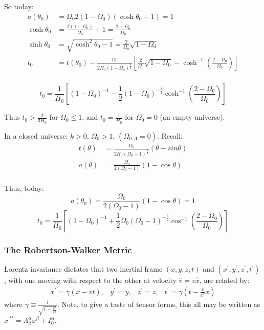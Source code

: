 \documentclass{article}
\def\hf{\frac12}
\def\inv#1{\frac{1}{ #1}}
\def\thnot{\theta_0}
\def\etot{\Omega_0}
\def\econs{\Omega_{0,\Lambda}}
\def\econs{\Omega_{0,\Lambda}}
\def\p{^\prime}
\def\hf{\frac12}
\def\thnot{\theta_0}
\def\etot{\Omega_0}
\def\econs{\Omega_{0,\Lambda}}
\def\econs{\Omega_{0,\Lambda}}
\def\p{^\prime}
\begin{document}
So today: 
\begin{align}
a(\thnot)&={\etot}{ 2(1-\etot)}(\cosh\thnot -1)=1\\
\cosh\thnot&=\frac{2(1-\etot)}{\etot}+1=\frac{2-\etot}{\etot}\\
\sinh\thnot&=\sqrt{\cosh^2\thnot-1}=\frac{2}{\etot}\sqrt{1-\etot}\\
t_0&=t(\thnot)-\frac{\etot}{ 2H_0(1-\etot)^\frac{3}{ 2}}\left[\frac{2}{\etot}
\sqrt{1-\etot}-\cosh^{-1}\left(\frac{2-\etot}{\etot}\right)\right]\\
\end{align}

$$\boxed{t_0=\inv{H_0}\left[(1-\etot)^{-1}-\hf(1-\etot)^{-\frac{3}{ 2}}
\cosh^{-1}\left(\frac{2-\etot}{\etot}\right)\right]}$$

Thus $t_0>\frac{2}{ 3H_0}$ for $\etot\le 1$, and $t_0=\inv{H_0}$ for $\etot=0$
(an empty universe).

In a closed universe: $k>0$, $\etot>1$, $(\econs=0)$. Recall: 
\begin{align}
t(\theta)&=\frac{\etot}{ 2H_0(\etot -1)^\frac{3}{2}}(\theta-sin\theta)\\
a(\theta)&=\frac{\etot}{ 2(\etot -1)}(1-\cos\theta)\\
\end{align}

Thus, today:
$$a(\theta_0)=\frac{\etot}{ 2(\etot -1)}(1-\cos\theta)=1$$
$$\boxed{t_0=\inv{H_0}\left[(1-\etot)^{-1}+\hf\etot(\etot-1)^{-\frac{3}{ 2}}
\cos^{-1}\left(\frac{2-\etot}{\etot}\right)\right]}$$

\subsubsection{ The Robertson-Walker Metric}

Lorentz invariance dictates that two inertial
frame $(x, y, z, t)$ and $(x\p, y\p, z\p, t\p)$, with one 
moving with respect to the other at velocity $\hat v=v\hat x$, are related by:
$$\begin{matrix} x\p=\gamma(x-vt),&y\p=y,&z\p=z,&t\p=\gamma\left(t-\frac{v}{ c^2}x
\right)\end{matrix}$$
where $\gamma\equiv\frac{1}{\sqrt{1-\frac{v^2}{ c^2}}}$.  
Note, to give a taste of tensor forms, this all
may be written as ${x\p}^\alpha = \Lambda^\alpha_\beta x^\beta+I_0^\alpha$.\par
\end{document}
